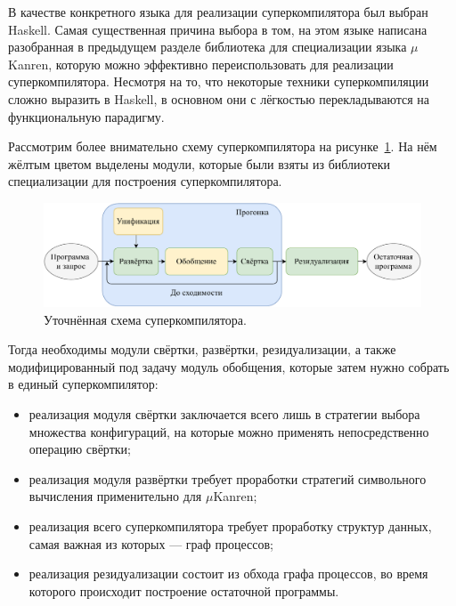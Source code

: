 В качестве конкретного языка для реализации суперкомпилятора был выбран Haskell.
Самая существенная причина выбора в том, на этом языке написана разобранная
в предыдущем разделе библиотека для специализации языка $\mu$Kanren, которую
можно эффективно переиспользовать для реализации суперкомпилятора.
Несмотря на то, что некоторые техники суперкомпиляции сложно выразить
в Haskell, в основном они
с лёгкостью перекладываются на функциональную парадигму.

Рассмотрим более внимательно схему суперкомпилятора на рисунке~\ref{fig:scompWork}.
На нём жёлтым цветом выделены модули, которые были взяты из библиотеки
специализации для построения суперкомпилятора.

\begin{figure}[h!]
\center
\includegraphics[scale=0.75]{sc/scompflow.pdf}
\caption{Уточнённая схема суперкомпилятора.}
\label{fig:scompWork}
\end{figure}

Тогда необходимы модули  свёртки, развёртки, резидуализации,
а также модифицированный под задачу модуль обобщения, которые затем
нужно собрать в единый суперкомпилятор:
\begin{itemize}

\item реализация модуля свёртки заключается всего лишь в стратегии выбора множества
      конфигураций, на которые можно применять непосредственно операцию свёртки;

\item реализация модуля развёртки требует проработки стратегий символьного вычисления
      применительно для $\mu$Kanren;
\item реализация всего суперкомпилятора требует проработку структур данных, самая
      важная из которых --- граф процессов;
\item реализация резидуализации состоит из обхода графа процессов, во время
      которого происходит построение остаточной программы.
\end{itemize}

